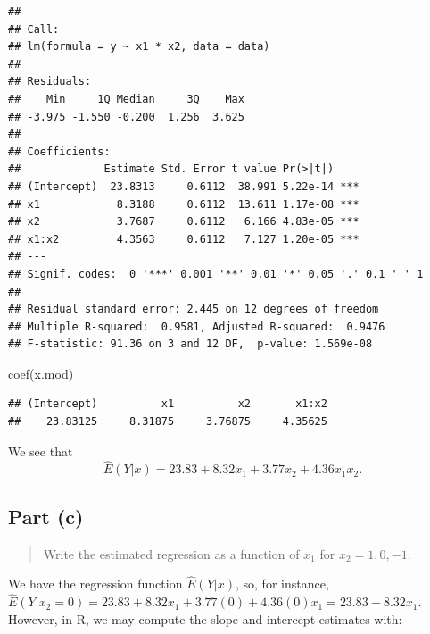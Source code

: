 \documentclass[
]{article}
\newenvironment{Shaded}{\begin{snugshade}}{\end{snugshade}}
\newcommand{\FunctionTok}[1]{\textcolor[rgb]{0.00,0.00,0.00}{#1}}
\newcommand{\NormalTok}[1]{#1}
\begin{document}
\begin{verbatim}
## 
## Call:
## lm(formula = y ~ x1 * x2, data = data)
## 
## Residuals:
##    Min     1Q Median     3Q    Max 
## -3.975 -1.550 -0.200  1.256  3.625 
## 
## Coefficients:
##             Estimate Std. Error t value Pr(>|t|)    
## (Intercept)  23.8313     0.6112  38.991 5.22e-14 ***
## x1            8.3188     0.6112  13.611 1.17e-08 ***
## x2            3.7687     0.6112   6.166 4.83e-05 ***
## x1:x2         4.3563     0.6112   7.127 1.20e-05 ***
## ---
## Signif. codes:  0 '***' 0.001 '**' 0.01 '*' 0.05 '.' 0.1 ' ' 1
## 
## Residual standard error: 2.445 on 12 degrees of freedom
## Multiple R-squared:  0.9581, Adjusted R-squared:  0.9476 
## F-statistic: 91.36 on 3 and 12 DF,  p-value: 1.569e-08
\end{verbatim}

\begin{Shaded}
\begin{Highlighting}[]
\FunctionTok{coef}\NormalTok{(x.mod)}
\end{Highlighting}
\end{Shaded}

\begin{verbatim}
## (Intercept)          x1          x2       x1:x2 
##    23.83125     8.31875     3.76875     4.35625
\end{verbatim}

We see that \[
  \hat{E}(Y|x) = 23.83 + 8.32 x_1 + 3.77 x_2 + 4.36 x_1 x_2.
\]

\hypertarget{part-c}{%
\subsection{Part (c)}\label{part-c}}

\begin{quote}
Write the estimated regression as a function of \(x_1\) for
\(x_2 = 1,0,-1\).
\end{quote}

We have the regression function \(\hat{E}(Y|x)\), so, for instance,
\(\hat{E}(Y|x_2=0) = 23.83 + 8.32 x_1 + 3.77 (0) + 4.36 (0) x_1 = 23.83+8.32 x_1\).
However, in R, we may compute the slope and intercept estimates with:
\end{document}
